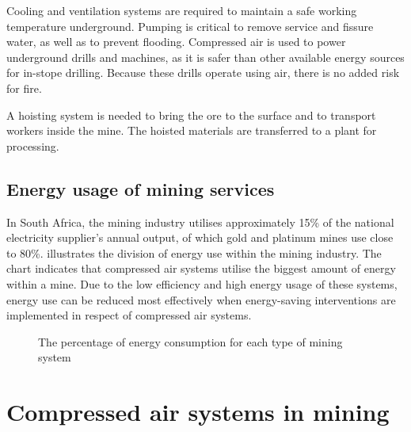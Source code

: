 	 Cooling and ventilation systems are required to maintain a safe working temperature underground. Pumping is critical to remove service and fissure water, as well as to prevent flooding. Compressed air is used to power underground drills and machines, as it is safer than other available energy sources for in-stope drilling. Because these drills operate using air, there is no added risk for fire.
	 \par
	  A hoisting system is needed to bring the ore to the surface and to transport workers inside the mine. The hoisted materials are transferred to a plant for processing.  
		
		\subsection{Energy usage of mining services}
		
			In South Africa, the mining industry utilises approximately 15\% of the national electricity supplier's annual output, of which gold and platinum mines use  close to 80\%\footnotemark[1].  illustrates the division of energy use within the mining industry. The chart indicates that compressed air systems utilise the biggest amount of energy within a mine. Due to the low efficiency and high energy usage of these systems, energy use can be reduced most effectively when energy-saving interventions are implemented in respect of compressed air systems.
			\begin{figure}[h]
				\centering
				\fbox{}
				\caption[The percentage of energy consumption for each type of mining system]{The percentage of energy consumption for each type of mining system \cite{le2005energy}}
				\label{fig: Energy Split}
			\end{figure}
\section{Compressed air systems in mining}
